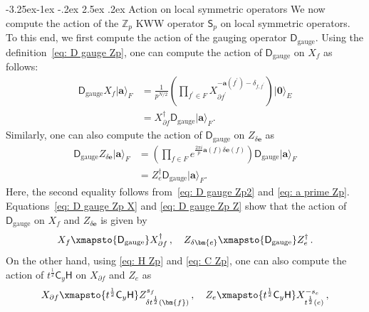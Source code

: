 \documentclass[aps,twocolumn,prx,floatfix,preprintnumbers, nofootinbib,10pt]{revtex4-2}
\makeatletter
\numberwithin{equation}{section}
\theoremstyle{definition}
\theoremstyle{remark}
\theoremstyle{claim}
\renewcommand\subsubsection{\@startsection{subsubsection}{3}{\z@}%
                                     {-3.25ex\@plus -1ex \@minus -.2ex}%
                                     {2.5ex \@plus .2ex}%
                                     {\centering\itshape\bfseries\small}}
\def\ket#1{{|{#1}\rangle}}
\renewcommand{\sf}[1]{\mathsf{#1}}
\makeatother
\begin{document}
\subsubsection{Action on local symmetric operators}
We now compute the action of the $\mathbb{Z}_p$ KWW operator $\mathsf{S}_p$ on local symmetric operators.
To this end, we first compute the action of the gauging operator $\mathsf{D}_{\mathrm{gauge}}$.
Using the definition~\eqref{eq: D gauge Zp}, one can compute the action of $\mathsf{D}_{\mathrm{gauge}}$ on $X_f$ as follows:
\begin{equation}
\begin{aligned}
\mathsf{D}_{\mathrm{gauge}} X_f \ket{\bm{a}}_F
&= \frac{1}{p^{N/2}} \left( \prod_{f^{\prime} \in F} X_{\partial f^{\prime}}^{-\bm{a}(f^{\prime}) - \delta_{f, f^{\prime}}} \right) \ket{\bm{0}}_E \\
&= X_{\partial f}^{\dagger} \mathsf{D}_{\mathrm{gauge}} \ket{\bm{a}}_F.
\end{aligned}
\label{eq: D gauge Zp X}
\end{equation}
Similarly, one can also compute the action of $\mathsf{D}_{\mathrm{gauge}}$ on $Z_{\delta \bm{e}}$ as
\begin{equation}
\begin{aligned}
\mathsf{D}_{\mathrm{gauge}} Z_{\delta \bm{e}} \ket{\bm{a}}_F
&= \left( \prod_{f \in F} e^{\frac{2\pi i}{p} \bm{a}(f) \delta \bm{e}(f)} \right) \mathsf{D}_{\mathrm{gauge}} \ket{\bm{a}}_F \\
&= Z_e^{\dagger} \mathsf{D}_{\mathrm{gauge}} \ket{\bm{a}}_F.
\end{aligned}
\label{eq: D gauge Zp Z}
\end{equation}
Here, the second equality follows from~\eqref{eq: D gauge Zp2} and \eqref{eq: a prime Zp}.
Equations~\eqref{eq: D gauge Zp X} and \eqref{eq: D gauge Zp Z} show that the action of $\mathsf{D}_{\mathrm{gauge}}$ on $X_f$ and $Z_{\delta \bm{e}}$ is given by
\begin{equation}
X_f \xmapsto{\sf{D}_{\mathrm{gauge}}} X_{\partial f}^{\dagger} \,, \quad
Z_{\delta \bm{e}} \xmapsto{\sf{D}_{\mathrm{gauge}}} Z_e^{\dagger} \,.
\label{eq: D gauge Zp action}
\end{equation}
On the other hand, using \eqref{eq: H Zp} and \eqref{eq: C Zp}, one can also compute the action of $t^{\frac{1}{2}}\mathsf{C}_y\mathsf{H}$ on $X_{\partial f}$ and $Z_e$ as
\begin{equation}
X_{\partial f} \xmapsto{t^{\frac{1}{2}} \mathsf{C}_y \mathsf{H}} Z_{\delta t^{\frac{1}{2}}(\bm{f})}^{s_f} \,, \quad
Z_e \xmapsto{t^{\frac{1}{2}} \mathsf{C}_y \mathsf{H}} X_{t^{\frac{1}{2}}(e)}^{-s_e} \,,
\label{eq: H Zp action}
\end{equation}
\end{document}
